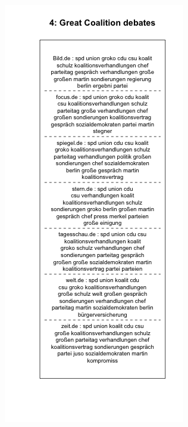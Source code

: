 \documentclass[12pt,a4paper,notitlepage]{article}
\begin{document}
{%
\begin{figure}[H]
	\begin{center}
		\begin{subfigure}[normla]{0.49\textwidth}
			\includegraphics[width=\textwidth]{../figs/plotquote4.png}

\end{subfigure}
\end{center}
\end{figure}}
\end{document}

